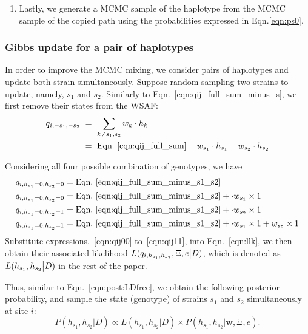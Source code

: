 \documentclass{bioinfo}
\begin{document}
\begin{enumerate}
\item Lastly, we generate a MCMC sample of the haplotype from the MCMC sample of the copied path using the probabilities expressed in Eqn.\eqref{eqn:ps0}.
\end{enumerate}


\subsubsection{Gibbs update for a pair of haplotypes}\label{sec:deconvolute}
In order to improve the MCMC mixing, we consider pairs of haplotypes and update both strain simultaneously. Suppose random sampling two strains to update, namely, $s_1$ and $s_2$. Similarly to Eqn.~\eqref{eqn:qij_full_sum_minus_s}, we first remove their states from the WSAF:
\begin{equation}
\begin{split}
q_{i,-s_1, -s_2} & ~ = ~ \sum_{k\neq s_1,s_2} w_k \cdot h_k \\
                 & ~ = ~ \textrm{Eqn.~\eqref{eqn:qij_full_sum}} - w_{s_1} \cdot h_{s_1} - w_{s_2} \cdot h_{s_2} \label{eqn:qij_full_sum_minus_s1_s2}
\end{split}
\end{equation}

Considering all four possible combination of genotypes, we have
\begin{align}
q_{i,h_{s_1}=0,h_{s_2}=0} & = \textrm{Eqn.~\eqref{eqn:qij_full_sum_minus_s1_s2}} \label{eqn:qij00}\\
q_{i,h_{s_1}=0,h_{s_2}=0} & = \textrm{Eqn.~\eqref{eqn:qij_full_sum_minus_s1_s2}} + \cdot w_{s_1} \times 1 \label{eqn:qij10}\\
q_{i,h_{s_1}=0,h_{s_2}=1} & = \textrm{Eqn.~\eqref{eqn:qij_full_sum_minus_s1_s2}} + \cdot w_{s_2} \times 1 \label{eqn:qij01}\\
q_{i,h_{s_1}=0,h_{s_2}=1} & = \textrm{Eqn.~\eqref{eqn:qij_full_sum_minus_s1_s2}} + \cdot w_{s_1} \times 1 + w_{s_2} \times 1 \label{eqn:qij11}
\end{align}
Substitute expressions.~\eqref{eqn:qij00} to~\eqref{eqn:qij11}, into Eqn.~\eqref{eqn:llk}, we then obtain their associated likelihood $L(q_{i,h_{s_1},h_{s_2}} , \Xi, e \big{|} D)$, which is denoted as $L(h_{s_1},h_{s_2} \big{|} D)$ in the rest of the paper.

Thus, similar to Eqn.~\eqref{eqn:post:LDfree}, we obtain the following posterior probability, and sample the state (genotype) of strains $s_1$ and $s_2$ simultaneously at site $i$:
\begin{equation}
P(h_{s_1},h_{s_2} | D) \propto L(h_{s_1},h_{s_2} |D) \times P(h_{s_1},h_{s_2} | \mathbf{w}, \Xi, e).\label{eqn:post.two:LD}
\end{equation}
\end{document}
